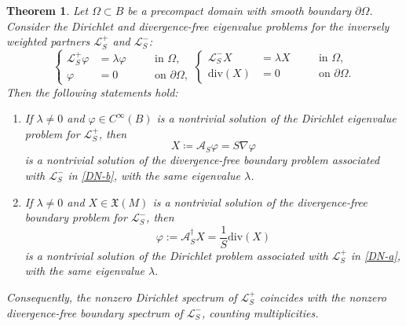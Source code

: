 \documentclass{amsart}
\newtheorem{theorem}{Theorem}[section]
\theoremstyle{definition}
\theoremstyle{remark}
\numberwithin{equation}{section}
\newcommand{\diver}{{{\mathrm{div}}}}
\begin{document}
\begin{theorem}\label{DirichletNeumannProblem}
Let $\Omega\subset B$ be a precompact domain with smooth boundary $\partial \Omega$. Consider the Dirichlet and divergence-free eigenvalue problems for the inversely weighted partners $\mathscr{L}_S^{+}$ and $\mathscr{L}_S^{-}$:
\begin{subequations}\label{DN}
\begin{equation}\label{DN-a}
\left\{
\begin{aligned}
\mathscr{L}_S^{+}\varphi &= \lambda \varphi \quad &&\text{in } \Omega
,\\
\varphi &= 0 \quad &&\text{on } \partial \Omega,
\end{aligned}
\right.
\end{equation}

\begin{equation}\label{DN-b}
\left\{
\begin{aligned}
\mathscr{L}_S^{-}X &= \lambda X \quad &&\text{in } \Omega,\\
\diver(X) &= 0 \quad &&\text{on } \partial \Omega.
\end{aligned}
\right.
\end{equation}
\end{subequations}
Then the following statements hold:
\begin{enumerate}
 \item If $\lambda \neq 0$ and $\varphi \in C^{\infty}(B)$ is a nontrivial solution of the Dirichlet eigenvalue problem for $\mathscr L_S^{+}$, then
 \[
 X \coloneqq \mathcal A_S \varphi = S \nabla \varphi 
 \]
is a nontrivial solution of the divergence-free boundary problem associated with $\mathscr L_S^{-}$ in \eqref{DN-b}, with the same eigenvalue $\lambda$.
 \item If $\lambda \neq 0$ and $X \in \mathfrak{X}(M)$ is a nontrivial solution of the divergence-free boundary problem for $\mathscr L_S^{-}$, then
 \[
 \varphi:=\mathcal{A}^\dag_SX=\frac{1}{S}\diver(X)
 \]
 is a nontrivial solution of the Dirichlet problem associated with $\mathscr L_S^{+}$ in \eqref{DN-a}, with the same eigenvalue $\lambda$.
\end{enumerate}
Consequently, the nonzero Dirichlet spectrum of $\mathscr L_S^{+}$ coincides with the nonzero divergence-free boundary spectrum of $\mathscr L_S^{-}$, counting multiplicities. 
\end{theorem}
\end{document}
